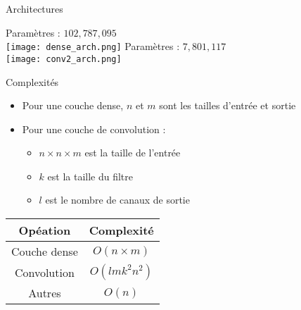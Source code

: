 \documentclass{falconbeamer}
\begin{document}
\begin{frame}{Architectures}
	\begin{center}
		Paramètres : $102,787,095$\\
		\texttt{[image: dense\_arch.png]}
		\smallskip
		\newline
		Paramètres : $7,801,117$\\
		\texttt{[image: conv2\_arch.png]}
	\end{center}
\end{frame}

\begin{frame}{Complexités}
	\begin{itemize}
		\item Pour une couche dense, $n$ et $m$ sont les tailles d'entrée et sortie
		\item Pour une couche de convolution :
		\begin{itemize}
			\item $n\times n\times m$ est la taille de l'entrée
			\item $k$ est la taille du filtre
			\item $l$ est le nombre de canaux de sortie
		\end{itemize}
	\end{itemize}
	\begin{center}
	\begin{tabular}{|c|c|}
		\hline
		\textbf{Opéation} & \textbf{Complexité} \\
		\hline
		Couche dense & $O(n\times m)$ \\
		\hline
		Convolution & $O(lmk^2n^2)$\\
		\hline
		Autres & $O(n)$\\
		\hline
	\end{tabular}
	\end{center}
\end{frame}
\end{document}
